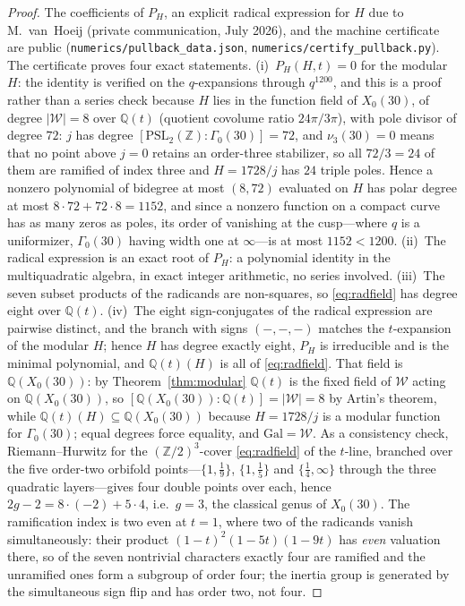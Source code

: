\documentclass[cntp]{ipart}
\theoremstyle{plain}
\theoremstyle{remark}
\begin{document}
\begin{proof}
The coefficients of $P_H$, an explicit radical expression for $H$ due to
M.~van~Hoeij (private communication, July 2026), and the machine certificate are public
(\texttt{numerics/\allowbreak pullback\_\allowbreak data.json},
\texttt{numerics/\allowbreak certify\_\allowbreak pullback.py}). The certificate proves four
exact statements. (i)~$P_H(H,t)=0$ for the modular $H$: the identity is verified on the $q$-expansions
through $q^{1200}$, and this is a proof rather than a series check because $H$ lies in the function field of
$X_0(30)$, of degree $|\mathcal{W}|=8$ over $\mathbb{Q}(t)$ (quotient covolume ratio $24\pi/3\pi$), with pole
divisor of degree $72$: $j$ has degree $[\mathrm{PSL}_2(\mathbb{Z}):\Gamma_0(30)]=72$, and $\nu_3(30)=0$ means
that no point above $j=0$ retains an order-three stabilizer, so all $72/3=24$ of them are ramified of index
three and $H=1728/j$ has $24$ triple poles. Hence a nonzero polynomial of bidegree at most $(8,72)$ evaluated
on $H$ has polar degree at most $8\cdot72+72\cdot8=1152$, and since a nonzero function on a compact curve has
as many zeros as poles, its order of vanishing at the cusp---where $q$ is a uniformizer, $\Gamma_0(30)$ having
width one at $\infty$---is at most $1152<1200$. (ii)~The radical expression is an exact root of
$P_H$: a polynomial identity in the multiquadratic algebra, in exact integer arithmetic, no series involved.
(iii)~The seven subset products of the radicands are non-squares, so \eqref{eq:radfield} has degree eight
over $\mathbb{Q}(t)$. (iv)~The eight sign-conjugates of the radical expression are pairwise distinct, and the
branch with signs $(-,-,-)$ matches the $t$-expansion of the modular $H$; hence $H$ has degree exactly eight,
$P_H$ is irreducible and is the minimal polynomial, and $\mathbb{Q}(t)(H)$ is all of \eqref{eq:radfield}.
That field is $\mathbb{Q}(X_0(30))$: by Theorem~\ref{thm:modular} $\mathbb{Q}(t)$ is the fixed field of
$\mathcal{W}$ acting on $\mathbb{Q}(X_0(30))$, so $[\mathbb{Q}(X_0(30)):\mathbb{Q}(t)]=|\mathcal{W}|=8$ by
Artin's theorem, while $\mathbb{Q}(t)(H)\subseteq\mathbb{Q}(X_0(30))$ because $H=1728/j$ is a modular function
for $\Gamma_0(30)$; equal degrees force equality, and $\mathrm{Gal}=\mathcal{W}$. As a consistency check,
Riemann--Hurwitz for the $(\mathbb{Z}/2)^3$-cover \eqref{eq:radfield} of the $t$-line, branched over the five
order-two orbifold points---$\{1,\tfrac19\}$, $\{1,\tfrac15\}$ and $\{\tfrac14,\infty\}$ through the three
quadratic layers---gives four double points over each, hence $2g-2=8\cdot(-2)+5\cdot4$, i.e.\ $g=3$, the
classical genus of $X_0(30)$. The ramification index is two even at $t=1$, where two of the radicands vanish
simultaneously: their product $(1-t)^2(1-5t)(1-9t)$ has \emph{even} valuation there, so of the seven nontrivial
characters exactly four are ramified and the unramified ones form a subgroup of order four; the inertia group is
generated by the simultaneous sign flip and has order two, not four.
\end{proof}
\end{document}
